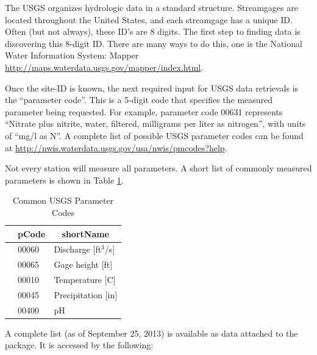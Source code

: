 \documentclass[a4paper,11pt]{article}\usepackage[]{graphicx}\usepackage[]{color}
\begin{document}
The USGS organizes hydrologic data in a standard structure.  Streamgages are located throughout the United States, and each streamgage has a unique ID.  Often (but not always), these ID's are 8 digits.  The first step to finding data is discovering this 8-digit ID. There are many ways to do this, one is the National Water Information System: Mapper \url{http://maps.waterdata.usgs.gov/mapper/index.html}.

Once the site-ID is known, the next required input for USGS data retrievals is the \enquote{parameter code}.  This is a 5-digit code that specifies the measured parameter being requested.  For example, parameter code 00631 represents \enquote{Nitrate plus nitrite, water, filtered, milligrams per liter as nitrogen}, with units of \enquote{mg/l as N}. A complete list of possible USGS parameter codes can be found at \url{http://nwis.waterdata.usgs.gov/usa/nwis/pmcodes?help}.

Not every station will measure all parameters. A short list of commonly measured parameters is shown in Table \ref{tab:params}.


\begin{table}[ht]
\caption{Common USGS Parameter Codes} 
\label{tab:params}
{\footnotesize
\begin{tabular}{rll}
  \hline
 & \multicolumn{1}{c}{\textbf{\textsf{pCode}}} & \multicolumn{1}{c}{\textbf{\textsf{shortName}}} \\ 
  \hline
 & 00060 & Discharge [ft$^3$/s] \\ 
  [5pt] & 00065 & Gage height [ft] \\ 
  [5pt] & 00010 & Temperature [C] \\ 
  [5pt] & 00045 & Precipitation [in] \\ 
  [5pt] & 00400 & pH \\ 
   \hline
\end{tabular}
}
\end{table}


A complete list (as of September 25, 2013) is available as data attached to the package. It is accessed by the following:
\end{document}
